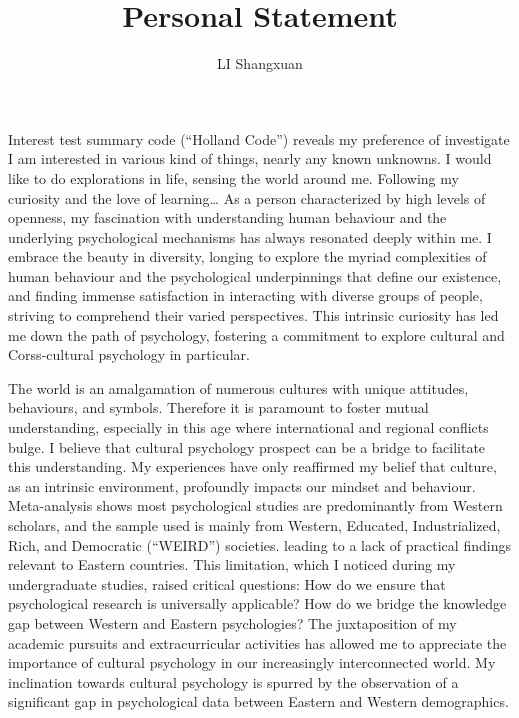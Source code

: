 \documentclass[]{article}
\title{Personal Statement}
\author{LI Shangxuan}
\begin{document}
\maketitle



Interest test summary code (``Holland Code'') reveals my preference of investigate
I am interested in various kind of things, nearly any known unknowns.
I would like to do explorations in life, sensing the world around me.
Following my curiosity and the love of learning\dots
As a person characterized by high levels of openness, my fascination with understanding human behaviour and the underlying psychological mechanisms has always resonated deeply within me.
I embrace the beauty in diversity, longing to explore the myriad complexities of human behaviour and the psychological underpinnings that define our existence, and finding immense satisfaction in interacting with diverse groups of people, striving to comprehend their varied perspectives.
This intrinsic curiosity has led me down the path of psychology, fostering a commitment to explore cultural and Corss-cultural psychology in particular.

The world is an amalgamation of numerous cultures with unique attitudes, behaviours, and symbols.
Therefore it is paramount to foster mutual understanding, especially in this age where international and regional conflicts bulge.
I believe that cultural psychology prospect can be a bridge to facilitate this understanding.
My experiences have only reaffirmed my belief that culture, as an intrinsic environment, profoundly impacts our mindset and behaviour.
Meta-analysis shows \autocite{henrich_weirdest_2010} most psychological studies are predominantly from Western scholars, and the sample used is mainly from Western, Educated, Industrialized, Rich, and Democratic (``WEIRD'') societies.
leading to a lack of practical findings relevant to Eastern countries.
This limitation, which I noticed during my undergraduate studies, raised critical questions: How do we ensure that psychological research is universally applicable? How do we bridge the knowledge gap between Western and Eastern psychologies?
The juxtaposition of my academic pursuits and extracurricular activities has allowed me to appreciate the importance of cultural psychology in our increasingly interconnected world.
My inclination towards cultural psychology is spurred by the observation of a significant gap in psychological data between Eastern and Western demographics.
\end{document}
